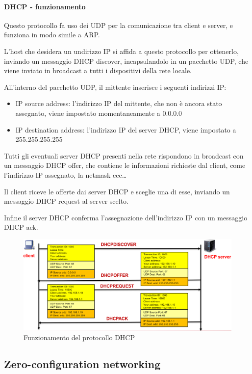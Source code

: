 \paragraph{DHCP - funzionamento}
Questo protocollo fa uso dei UDP per la comunicazione tra client e server, e funziona in modo simile a ARP.

L'host che desidera un undirizzo IP si affida a questo protocollo per ottenerlo, inviando un messaggio DHCP discover, incapsulandolo in un pacchetto UDP, che viene inviato in broadcast a tutti i dispositivi della rete locale.

All'interno del pacchetto UDP, il mittente inserisce i seguenti indirizzi IP:
\begin{itemize}
    \item IP source address: l'indirizzo IP del mittente, che non è ancora stato assegnato, viene impostato momentaneamente a 0.0.0.0
    \item IP destination address: l'indirizzo IP del server DHCP, viene impostato a 255.255.255.255
\end{itemize}

Tutti gli eventuali server DHCP presenti nella rete rispondono in broadcast con un messaggio DHCP offer, che contiene le informazioni richieste dal client, come l'indirizzo IP assegnato, la netmask ecc\dots

Il client riceve le offerte dai server DHCP e sceglie una di esse, inviando un messaggio DHCP request al server scelto.

Infine il server DHCP conferma l'assegnazione dell'indirizzo IP con un messaggio DHCP ack.

    \begin{figure}[h!]
    \centering
    \includegraphics[width=1\textwidth]{images/dhcp.png}
    \caption{Funzionamento del protocollo DHCP}
    \label{fig:dhcp}
\end{figure}

\subsection{Zero-configuration networking}

